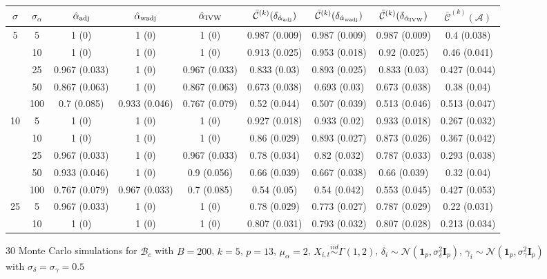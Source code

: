 \documentclass[10pt]{article}
\newcommand{\simiid}{\stackrel{iid}{\sim}} %
\def\normal#1#2{\mathcal{N}(#1,#2)} %
\def\mc#1{\mathcal{#1}} %
\theoremstyle{definition}
\begin{document}
\begin{sidewaysfigure}
\centering
\caption{30 Monte Carlo simulations for $\mc{B}_c$ with $B = 200$, $k = 5$, $p = 13$, $\mu_{\alpha}=2$, $X_{i,t} \simiid \Gamma(1,2)$, $\delta_i \sim \normal{\mathbf{1}_p}{\sigma^2_{\delta}\mathbf{I}_p}$, $\gamma_i \sim \normal{\mathbf{1}_p}{\sigma^2_{\gamma}\mathbf{I}_p}$ with $\sigma_{\delta}=\sigma_{\gamma}=0.5$}
\begin{tabular}{cc|ccc|cccc}
 $\sigma$   & $\sigma_{\alpha}$ &  $\hat{\alpha}_{\rm adj}$  & $\hat{\alpha}_{\rm wadj}$ & $\hat{\alpha}_{\rm IVW}$  & $\bar{\mc{C}}^{(k)}(\delta_{\hat{\alpha}_{\rm adj}})$  & $\bar{\mc{C}}^{(k)}(\delta_{\hat{\alpha}_{\rm wadj}})$ & $\bar{\mc{C}}^{(k)}(\delta_{\hat{\alpha}_{\rm IVW}})$ &  $\bar{\mc{C}}^{(k)}(\mc{A})$ \\[.3cm]  
  \hline
 \multirow{5}{*}{5} & 5  & 1 (0) & 1 (0) & 1 (0) & 0.987 (0.009) & 0.987 (0.009) & 0.987 (0.009) & 0.4 (0.038) \\ 
    & 10  & 1 (0) & 1 (0) & 1 (0) & 0.913 (0.025) & 0.953 (0.018) & 0.92 (0.025) & 0.46 (0.041) \\ 
    & 25  & 0.967 (0.033) & 1 (0) & 0.967 (0.033) & 0.833 (0.03) & 0.893 (0.025) & 0.833 (0.03) & 0.427 (0.044) \\ 
    & 50  & 0.867 (0.063) & 1 (0) & 0.867 (0.063) & 0.673 (0.038) & 0.693 (0.03) & 0.673 (0.038) & 0.38 (0.04) \\ 
    & 100  & 0.7 (0.085) & 0.933 (0.046) & 0.767 (0.079) & 0.52 (0.044) & 0.507 (0.039) & 0.513 (0.046) & 0.513 (0.047) \\[.3cm]  
   \multirow{5}{*}{10} & 5  & 1 (0) & 1 (0) & 1 (0) & 0.927 (0.018) & 0.933 (0.02) & 0.933 (0.018) & 0.267 (0.032) \\ 
    & 10  & 1 (0) & 1 (0) & 1 (0) & 0.86 (0.029) & 0.893 (0.027) & 0.873 (0.026) & 0.367 (0.042) \\ 
    & 25  & 0.967 (0.033) & 1 (0) & 0.967 (0.033) & 0.78 (0.034) & 0.82 (0.032) & 0.787 (0.033) & 0.293 (0.038) \\ 
    & 50  & 0.933 (0.046) & 1 (0) & 0.9 (0.056) & 0.66 (0.039) & 0.667 (0.038) & 0.66 (0.039) & 0.32 (0.04) \\ 
    & 100  & 0.767 (0.079) & 0.967 (0.033) & 0.7 (0.085) & 0.54 (0.05) & 0.54 (0.042) & 0.553 (0.045) & 0.427 (0.053) \\[.3cm]  
   \multirow{5}{*}{25} & 5  & 0.967 (0.033) & 1 (0) & 1 (0) & 0.78 (0.029) & 0.773 (0.027) & 0.787 (0.029) & 0.22 (0.031) \\ 
    & 10  & 1 (0) & 1 (0) & 1 (0) & 0.807 (0.031) & 0.793 (0.032) & 0.807 (0.028) & 0.213 (0.034) \\ 

\end{tabular}
\end{sidewaysfigure}
\end{document}
